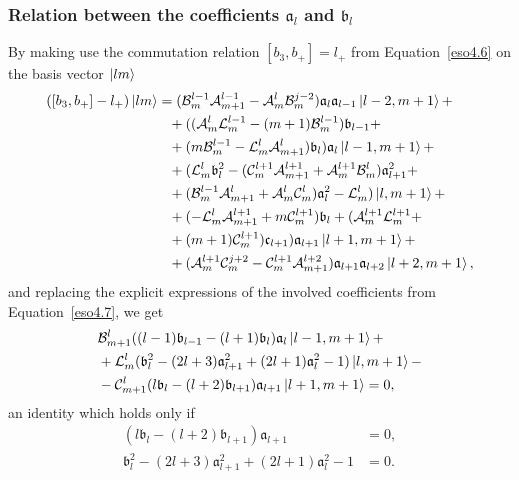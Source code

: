 \documentclass[12pt,a4paper]{report}
\theoremstyle{definition}
\theoremstyle{remark}
\theoremstyle{remark}
\begin{document}
\subsubsection{Relation between the coefficients $\mathfrak{a}_l$ and $\mathfrak{b}_l$}
By making use the commutation relation $[b_3,b_+]=l_+$ from Equation~\ref{eso4.6} on the basis vector $\ket{lm}$
\begin{align*}
([b_3,b_+]-l_+)\ket{lm}&=(\mathcal{B}_m^{l-1}\mathcal{A}_{m+1}^{l-1}-\mathcal{A}_m^l\mathcal{B}_m^{j-2})\mathfrak{a}_l\mathfrak{a}_{l-1}\ket{l-2,m+1}+\\
&\phantom{=}+((\mathcal{A}_m^l\mathcal{L}_m^{l-1}-(m+1)\mathcal{B}_m^{l-1})\mathfrak{b}_{l-1}+\\
&\phantom{=}+(m\mathcal{B}_m^{l-1}-\mathcal{L}_m^l\mathcal{A}_{m+1}^l)\mathfrak{b}_l)\mathfrak{a}_l\ket{l-1,m+1}+\\
&\phantom{=}+(\mathcal{L}_m^l\mathfrak{b}_l^2-(\mathcal{C}_m^{l+1}\mathcal{A}_{m+1}^{l+1}+\mathcal{A}_m^{l+1}\mathcal{B}_m^l)\mathfrak{a}_{l+1}^2+\\
&\phantom{=}+(\mathcal{B}_m^{l-1}\mathcal{A}_{m+1}^l+\mathcal{A}_m^l\mathcal{C}_m^l)\mathfrak{a}_l^2-\mathcal{L}_m^l)\ket{l,m+1}+\\
&\phantom{=}+(-\mathcal{L}_m^l\mathcal{A}_{m+1}^{l+1}+m\mathcal{C}_m^{l+1})\mathfrak{b}_l+(\mathcal{A}_m^{l+1}\mathcal{L}_m^{l+1}+\\
&\phantom{=}+(m+1)\mathcal{C}_m^{l+1})\mathfrak{c}_{l+1})\mathfrak{a}_{l+1}\ket{l+1,m+1}+\\
&\phantom{=}+(\mathcal{A}_m^{l+1}\mathcal{C}_m^{j+2}-\mathcal{C}_m^{l+1}\mathcal{A}_{m+1}^{l+2})\mathfrak{a}_{l+1}\mathfrak{a}_{l+2}\ket{l+2,m+1},
\end{align*}
and replacing the explicit expressions of the involved coefficients from Equation~\ref{eso4.7}, we get
\begin{align*}
&\mathcal{B}_{m+1}^l((l-1)\mathfrak{b}_{l-1}-(l+1)\mathfrak{b}_l)\mathfrak{a}_l\ket{l-1,m+1}+\\
&+\mathcal{L}_m^l(\mathfrak{b}_l^2-(2l+3)\mathfrak{a}_{l+1}^2+(2l+1)\mathfrak{a}_l^2-1)\ket{l,m+1}-\\
&-\mathcal{C}_{m+1}^l(l\mathfrak{b}_l-(l+2)\mathfrak{b}_{l+1})\mathfrak{a}_{l+1}\ket{l+1,m+1}=0,
\end{align*}
an identity which holds only if
\begin{equation}
\begin{aligned}\label{eso4.8}
(l\mathfrak{b}_l-(l+2)\mathfrak{b}_{l+1})\mathfrak{a}_{l+1}&=0,\\
\mathfrak{b}_l^2-(2l+3)\mathfrak{a}_{l+1}^2+(2l+1)\mathfrak{a}_l^2-1&=0.
\end{aligned}
\end{equation}
\end{document}
